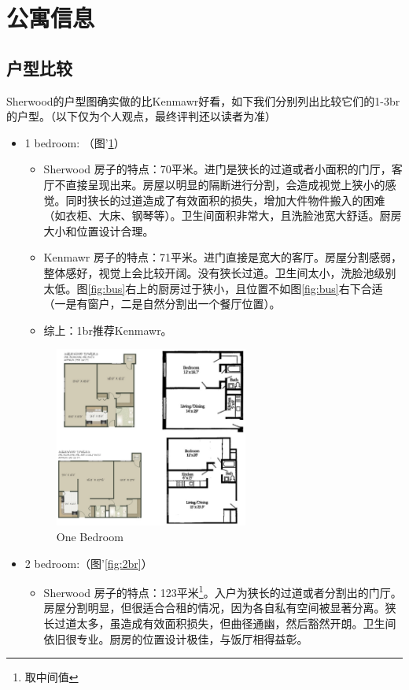 \documentclass[nofonts,a4paper,11pt]{article}
\begin{document}
\section{公寓信息}

\subsection{户型比较}
Sherwood的户型图确实做的比Kenmawr好看，如下我们分别列出比较它们的1-3br的户型。（以下仅为个人观点，最终评判还以读者为准）
\begin{itemize}
	\item 1 bedroom: （图'\ref{fig:1br}）
	\begin{itemize}
		\item Sherwood 房子的特点：70平米。进门是狭长的过道或者小面积的门厅，客厅不直接呈现出来。房屋以明显的隔断进行分割，会造成视觉上狭小的感觉。同时狭长的过道造成了有效面积的损失，增加大件物件搬入的困难（如衣柜、大床、钢琴等）。卫生间面积非常大，且洗脸池宽大舒适。厨房大小和位置设计合理。
		\item Kenmawr 房子的特点：71平米。进门直接是宽大的客厅。房屋分割感弱，整体感好，视觉上会比较开阔。没有狭长过道。卫生间太小，洗脸池级别太低。图\ref{fig:bus}右上的厨房过于狭小，且位置不如图\ref{fig:bus}右下合适（一是有窗户，二是自然分割出一个餐厅位置）。
		\item 综上：1br推荐Kenmawr。
	\end{itemize}
	\begin{figure}[!htb]
		\centering
		\includegraphics[width=0.6\textwidth]{./img/1br}
		\caption{One Bedroom}
		\label{fig:1br}
	\end{figure}
	\item 2 bedroom:（图'\ref{fig:2br}）
	\begin{itemize}
		\item Sherwood 房子的特点：123平米\footnote{取中间值}。入户为狭长的过道或者分割出的门厅。房屋分割明显，但很适合合租的情况，因为各自私有空间被显著分离。狭长过道太多，虽造成有效面积损失，但曲径通幽，然后豁然开朗。卫生间依旧很专业。厨房的位置设计极佳，与饭厅相得益彰。

\end{itemize}
\end{itemize}
\end{document}
